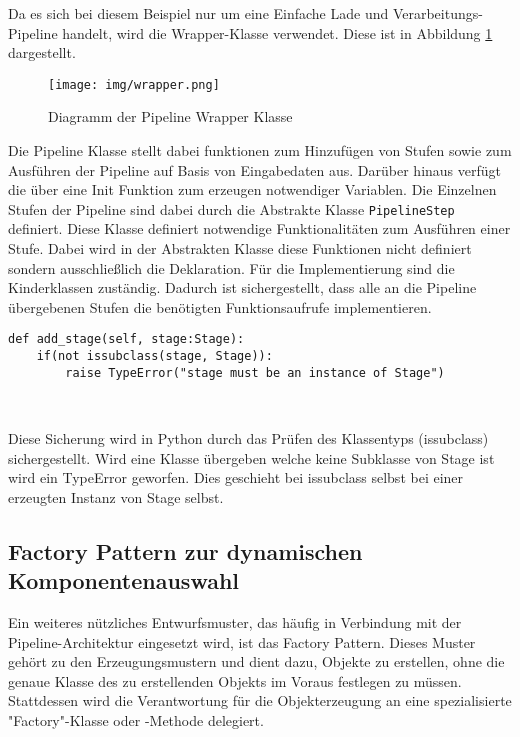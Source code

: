 \documentclass[a4paper]{article} %
\begin{document}
Da es sich bei diesem Beispiel nur um eine Einfache Lade und Verarbeitungs-Pipeline handelt, wird die Wrapper-Klasse verwendet. Diese ist in Abbildung \ref{fig:wrapper} dargestellt.

\begin{figure}[htbp] %
    \centering %
    \texttt{[image: img/wrapper.png]} %
    \caption{Diagramm der Pipeline Wrapper Klasse} %
    \label{fig:wrapper} %
\end{figure}

Die Pipeline Klasse stellt dabei funktionen zum Hinzufügen von Stufen sowie zum Ausführen der Pipeline auf Basis von Eingabedaten aus. Darüber hinaus verfügt die über eine Init Funktion zum erzeugen notwendiger Variablen. Die Einzelnen Stufen der Pipeline sind dabei durch die Abstrakte Klasse \texttt{PipelineStep} definiert. Diese Klasse definiert notwendige Funktionalitäten zum Ausführen einer Stufe. Dabei wird in der Abstrakten Klasse diese Funktionen nicht definiert sondern ausschließlich die Deklaration. Für die Implementierung sind die Kinderklassen zuständig. Dadurch ist sichergestellt, dass alle an die Pipeline übergebenen Stufen die benötigten Funktionsaufrufe implementieren.

\begin{verbatim}
def add_stage(self, stage:Stage):
    if(not issubclass(stage, Stage)):
        raise TypeError("stage must be an instance of Stage")
\end{verbatim}\

Diese Sicherung wird in Python durch das Prüfen des Klassentyps (issubclass) sichergestellt. Wird eine Klasse übergeben welche keine Subklasse von Stage ist wird ein TypeError geworfen. Dies geschieht bei issubclass selbst bei einer erzeugten Instanz von Stage selbst.

\subsection{Factory Pattern zur dynamischen Komponentenauswahl}
Ein weiteres nützliches Entwurfsmuster, das häufig in Verbindung mit der Pipeline-Architektur eingesetzt wird, ist das Factory Pattern. Dieses Muster gehört zu den Erzeugungsmustern und dient dazu, Objekte zu erstellen, ohne die genaue Klasse des zu erstellenden Objekts im Voraus festlegen zu müssen. Stattdessen wird die Verantwortung für die Objekterzeugung an eine spezialisierte "Factory"-Klasse oder -Methode delegiert.
\end{document}

